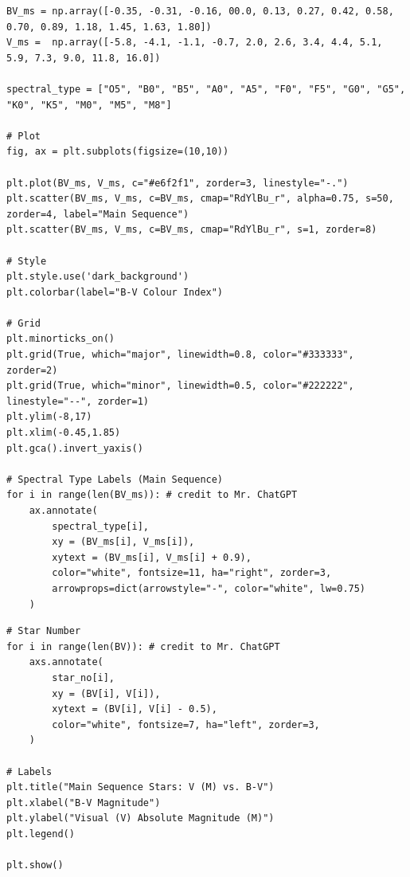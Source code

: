 \documentclass[12pt]{article}
\begin{document}
\begin{minipage}{\linewidth}
\captionsetup{hypcap=false}

\begin{mintedbox}
\begin{verbatim}
BV_ms = np.array([-0.35, -0.31, -0.16, 00.0, 0.13, 0.27, 0.42, 0.58, 0.70, 0.89, 1.18, 1.45, 1.63, 1.80])
V_ms =  np.array([-5.8, -4.1, -1.1, -0.7, 2.0, 2.6, 3.4, 4.4, 5.1, 5.9, 7.3, 9.0, 11.8, 16.0])

spectral_type = ["O5", "B0", "B5", "A0", "A5", "F0", "F5", "G0", "G5", "K0", "K5", "M0", "M5", "M8"]

# Plot
fig, ax = plt.subplots(figsize=(10,10))

plt.plot(BV_ms, V_ms, c="#e6f2f1", zorder=3, linestyle="-.")
plt.scatter(BV_ms, V_ms, c=BV_ms, cmap="RdYlBu_r", alpha=0.75, s=50, zorder=4, label="Main Sequence")
plt.scatter(BV_ms, V_ms, c=BV_ms, cmap="RdYlBu_r", s=1, zorder=8)

# Style
plt.style.use('dark_background')
plt.colorbar(label="B-V Colour Index")

# Grid
plt.minorticks_on()
plt.grid(True, which="major", linewidth=0.8, color="#333333", zorder=2)
plt.grid(True, which="minor", linewidth=0.5, color="#222222", linestyle="--", zorder=1)
plt.ylim(-8,17)
plt.xlim(-0.45,1.85)
plt.gca().invert_yaxis()

# Spectral Type Labels (Main Sequence) 
for i in range(len(BV_ms)): # credit to Mr. ChatGPT
    ax.annotate(
        spectral_type[i],
        xy = (BV_ms[i], V_ms[i]),
        xytext = (BV_ms[i], V_ms[i] + 0.9),
        color="white", fontsize=11, ha="right", zorder=3,
        arrowprops=dict(arrowstyle="-", color="white", lw=0.75)
    )

\end{verbatim}
\end{mintedbox}

\end{minipage}

\begin{minipage}{\linewidth}
\captionsetup{hypcap=false}

\begin{mintedbox}
\begin{verbatim}
# Star Number
for i in range(len(BV)): # credit to Mr. ChatGPT
    axs.annotate(
        star_no[i],
        xy = (BV[i], V[i]),
        xytext = (BV[i], V[i] - 0.5),
        color="white", fontsize=7, ha="left", zorder=3,
    )

# Labels
plt.title("Main Sequence Stars: V (M) vs. B-V")
plt.xlabel("B-V Magnitude")
plt.ylabel("Visual (V) Absolute Magnitude (M)")
plt.legend()

plt.show()

\end{verbatim}
\end{mintedbox}

\end{minipage}
\end{document}
